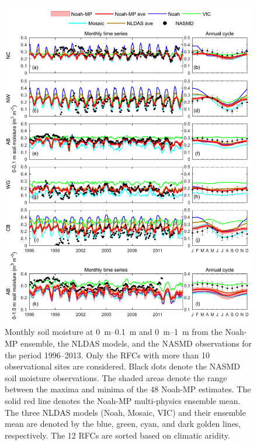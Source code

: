 \documentclass[essd, manuscript]{copernicus}
\begin{document}
\begin{figure}[t]
  \includegraphics[width=12cm]{fig/fig04.pdf}
  \caption{Monthly soil moisture at \qtyrange[range-phrase=--]{0}{0.1}{m} and \qtyrange[range-phrase=--]{0}{1}{m} from the Noah-MP ensemble, the NLDAS models, and the NASMD observations for the period 1996--2013. Only the RFCs with more than 10 observational sites are considered. Black dots denote the NASMD soil moisture observations. The shaded areas denote the range between the maxima and minima of the 48 Noah-MP estimates. The solid red line denotes the Noah-MP multi-physics ensemble mean. The three NLDAS models (Noah, Mosaic, VIC) and their ensemble mean are denoted by the blue, green, cyan, and dark golden lines, respectively. The 12 RFCs are sorted based on climatic aridity.}
  \label{fig:sm:ts}
\end{figure}
\end{document}
